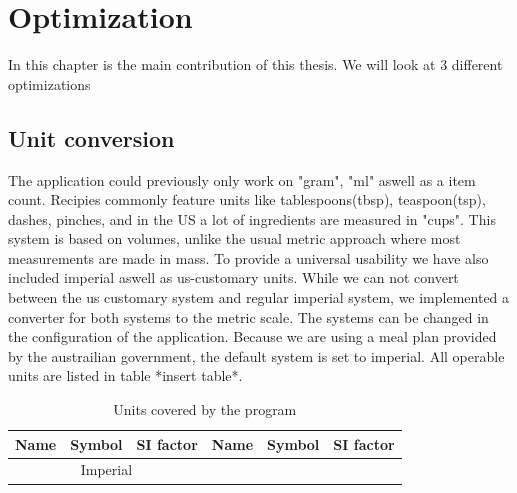 
\chapter{Optimization}\label{chapter:Optimisaiton}

In this chapter is the main contribution of this thesis. We will look at 3 different optimizations

\section{Unit conversion}\label{section:conversion}
The application could previously only work on "gram", "ml" aswell as a item count. Recipies commonly feature units like tablespoons(tbsp), teaspoon(tsp), dashes, pinches, and in the US a lot of ingredients are measured in "cups". This system is based on volumes, unlike the usual metric approach where most measurements are made in mass. To provide a universal usability we have also included imperial aswell as us-customary units. While we can not convert between the us customary system and regular imperial system, we implemented a converter for both systems to the metric scale. The systems can be changed in the configuration of the application. Because we are using a meal plan provided by the austrailian government, the default system is set to imperial. All operable units are listed in table *insert table*. \\


\begin{table}[htpb]
  \centering
  \begin{tabular}{|l|l|l||l|l|l|}
  	\hline
  	Name & Symbol & SI factor & Name & Symbol & SI factor \\
  	\hline
    \multicolumn{3}{|c|}{Imperial}
    \multicolumn{3}{|c|}{ US-Customary}
    \hline
    \multicolumn{6}{|c|}{Volume}
    \hline
  \end{tabular}
  \caption[Covered units]{Units covered by the program}\label{table:units}
\end{table}

